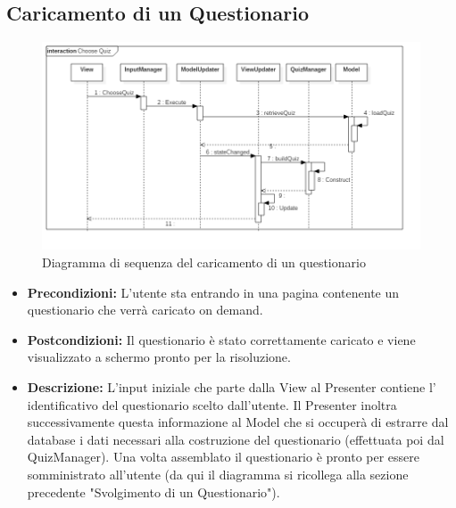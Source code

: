 \documentclass[a4paper,11pt]{article}
\begin{document}
	\subsection{Caricamento di un Questionario}
	\begin{figure}[h!]
	\begin{center}
		\includegraphics[scale=0.55]{../images/LoadQuiz.png}
		\caption{Diagramma di sequenza del caricamento di un questionario}
	\end{center}
	\end{figure}
	\begin{itemize}
	\item\textbf{Precondizioni:} L'utente sta entrando in una pagina contenente un questionario che verrà caricato on demand.\\
	\item\textbf{Postcondizioni:} Il questionario è stato correttamente caricato e viene visualizzato a schermo pronto per la risoluzione.\\
	\item\textbf{Descrizione:} L'input iniziale che parte dalla View al Presenter contiene l' identificativo del questionario scelto dall'utente. Il Presenter inoltra successivamente questa informazione al Model che si occuperà di estrarre dal database i dati necessari alla costruzione del questionario (effettuata poi dal QuizManager). Una volta assemblato il questionario è pronto per essere somministrato all'utente (da qui il diagramma si ricollega alla sezione precedente "Svolgimento di un Questionario").\\
	\end{itemize}
	\newpage
\end{document}
